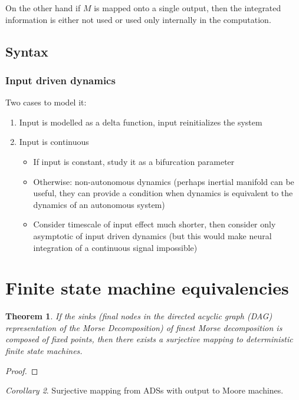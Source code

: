 \documentclass{scrartcl}
\newtheorem{theorem}{Theorem}
\theoremstyle{definition}
\theoremstyle{remark}
\newtheorem{corollary}[theorem]{Corollary}
\begin{document}
On the other hand if $M$ is  mapped onto a single output, then the integrated information is either not used or used only internally in the computation.

\subsection{Syntax}%

\subsubsection{Input driven dynamics}
Two cases to model it:
\begin{enumerate}
\item Input is modelled as a delta function, input reinitializes the system
\item Input is continuous 
\begin{itemize}
\item If input is constant, study it as a bifurcation parameter
\item Otherwise: non-autonomous dynamics (perhaps inertial manifold can be useful, they can provide a condition when dynamics is equivalent to the dynamics of an autonomous system)
\item Consider timescale of input effect much shorter, then consider only asymptotic of input driven dynamics (but this would make neural integration of a continuous signal impossible)
\end{itemize}
\end{enumerate}


\section{Finite state machine equivalencies}\label{sec:fsm}
\begin{theorem}
If the sinks (final nodes in the directed acyclic graph (DAG) representation of the Morse Decomposition) of finest Morse decomposition is composed of fixed points, then there exists a surjective mapping to deterministic finite state machines.
\end{theorem}

\begin{proof}

\end{proof}

\begin{corollary}
Surjective mapping from ADSs with output to Moore machines.
\end{corollary}
\end{document}
